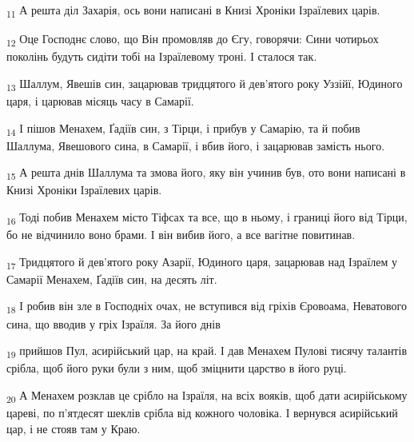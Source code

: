 \begin{tcolorbox}
\textsubscript{11} А решта діл Захарія, ось вони написані в Книзі Хроніки Ізраїлевих царів.
\end{tcolorbox}
\begin{tcolorbox}
\textsubscript{12} Оце Господнє слово, що Він промовляв до Єгу, говорячи: Сини чотирьох поколінь будуть сидіти тобі на Ізраїлевому троні. І сталося так.
\end{tcolorbox}
\begin{tcolorbox}
\textsubscript{13} Шаллум, Явешів син, зацарював тридцятого й дев'ятого року Уззійї, Юдиного царя, і царював місяць часу в Самарії.
\end{tcolorbox}
\begin{tcolorbox}
\textsubscript{14} І пішов Менахем, Ґадіїв син, з Тірци, і прибув у Самарію, та й побив Шаллума, Явешового сина, в Самарії, і вбив його, і зацарював замість нього.
\end{tcolorbox}
\begin{tcolorbox}
\textsubscript{15} А решта днів Шаллума та змова його, яку він учинив був, ото вони написані в Книзі Хроніки Ізраїлевих царів.
\end{tcolorbox}
\begin{tcolorbox}
\textsubscript{16} Тоді побив Менахем місто Тіфсах та все, що в ньому, і границі його від Тірци, бо не відчинило воно брами. І він вибив його, а все вагітне повитинав.
\end{tcolorbox}
\begin{tcolorbox}
\textsubscript{17} Тридцятого й дев'ятого року Азарії, Юдиного царя, зацарював над Ізраїлем у Самарії Менахем, Ґадіїв син, на десять літ.
\end{tcolorbox}
\begin{tcolorbox}
\textsubscript{18} І робив він зле в Господніх очах, не вступився від гріхів Єровоама, Неватового сина, що вводив у гріх Ізраїля. За його днів
\end{tcolorbox}
\begin{tcolorbox}
\textsubscript{19} прийшов Пул, асирійський цар, на край. І дав Менахем Пулові тисячу талантів срібла, щоб його руки були з ним, щоб зміцнити царство в його руці.
\end{tcolorbox}
\begin{tcolorbox}
\textsubscript{20} А Менахем розклав це срібло на Ізраїля, на всіх вояків, щоб дати асирійському цареві, по п'ятдесят шеклів срібла від кожного чоловіка. І вернувся асирійський цар, і не стояв там у Краю.
\end{tcolorbox}
